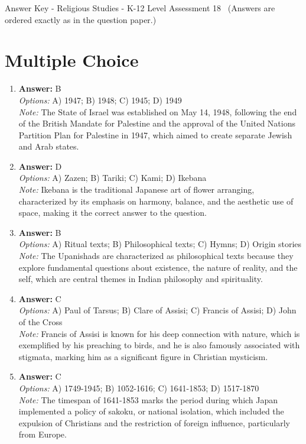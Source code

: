 \documentclass[12pt]{article}
\begin{document}
\begin{center}
Answer Key - Religious Studies - K-12 Level Assessment 18 \
\small (Answers are ordered exactly as in the question paper.)
\end{center}

\section*{Multiple Choice}
\begin{enumerate}[label=\arabic*.]
\item \textbf{Answer:} B
\\ \textit{Options:} A) 1947; B) 1948; C) 1945; D) 1949
\\ \textit{Note:} The State of Israel was established on May 14, 1948, following the end of the British Mandate for Palestine and the approval of the United Nations Partition Plan for Palestine in 1947, which aimed to create separate Jewish and Arab states.
\item \textbf{Answer:} D
\\ \textit{Options:} A) Zazen; B) Tariki; C) Kami; D) Ikebana
\\ \textit{Note:} Ikebana is the traditional Japanese art of flower arranging, characterized by its emphasis on harmony, balance, and the aesthetic use of space, making it the correct answer to the question.
\item \textbf{Answer:} B
\\ \textit{Options:} A) Ritual texts; B) Philosophical texts; C) Hymns; D) Origin stories
\\ \textit{Note:} The Upanishads are characterized as philosophical texts because they explore fundamental questions about existence, the nature of reality, and the self, which are central themes in Indian philosophy and spirituality.
\item \textbf{Answer:} C
\\ \textit{Options:} A) Paul of Tarsus; B) Clare of Assisi; C) Francis of Assisi; D) John of the Cross
\\ \textit{Note:} Francis of Assisi is known for his deep connection with nature, which is exemplified by his preaching to birds, and he is also famously associated with stigmata, marking him as a significant figure in Christian mysticism.
\item \textbf{Answer:} C
\\ \textit{Options:} A) 1749-1945; B) 1052-1616; C) 1641-1853; D) 1517-1870
\\ \textit{Note:} The timespan of 1641-1853 marks the period during which Japan implemented a policy of sakoku, or national isolation, which included the expulsion of Christians and the restriction of foreign influence, particularly from Europe.
\end{enumerate}
\end{document}
